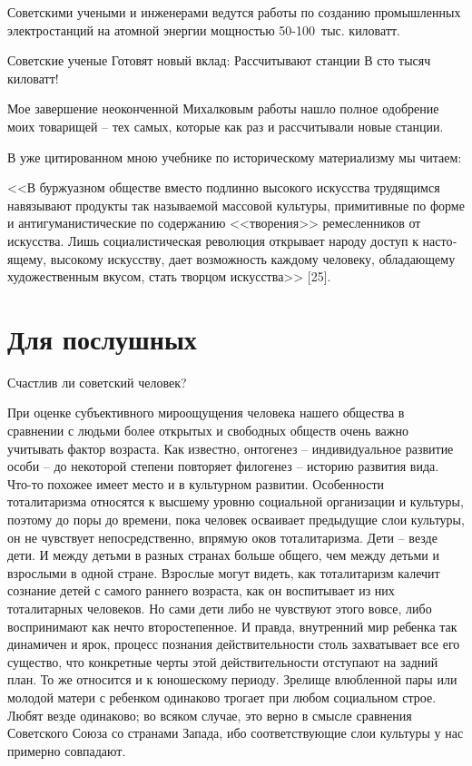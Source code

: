 \documentclass{book}
\begin{document}
\begin{minipage}{0.4\textwidth}
Советскими учеными и инженерами ведутся работы по созданию промышленных электростанций на атомной энергии мощностью 50-100~тыс. киловатт.
\end{minipage}
\hfill
\begin{minipage}{0.4\textwidth}
Советские ученые
Готовят новый вклад:
Рассчитывают станции
В сто тысяч киловатт!
\end{minipage}

Мое завершение неоконченной Михалковым работы нашло полное одобрение моих товарищей -- тех самых, которые как раз и рассчитывали 
новые станции.

В уже цитированном мною учебнике по историческому материализму мы читаем:

<<В буржуазном обществе вместо подлинно высокого искусства трудящимся навязывают продукты так называемой массовой культуры, 
примитивные по форме и антигуманистические по содержанию <<творения>> ремесленников от искусства. Лишь социалистическая революция 
открывает народу доступ к насто­ящему, высокому искусству, дает возможность каждому чело­веку, обладающему художественным вкусом, 
стать творцом искусства>> [25].


\section{Для послушных}

Счастлив ли советский человек?

При оценке субъективного мироощущения человека нашего общества в сравнении с людьми более открытых и свободных обществ очень 
важно учитывать фактор возраста. Как известно, онтогенез -- индивидуальное развитие особи -- до некоторой степени повторяет 
филогенез -- историю развития вида. Что-то похожее имеет место и в культурном развитии. Особен­ности тоталитаризма относятся к 
высшему уровню социальной организации и культуры, поэтому до поры до времени, пока человек осваивает предыдущие слои культуры, 
он не чувствует непосредственно, впрямую оков тоталитаризма. Дети -- везде дети. И между детьми в разных странах больше общего, 
чем между детьми и взрослыми в одной стране. Взрослые могут видеть, как тоталитаризм калечит сознание детей с самого раннего 
возраста, как он воспитывает из них тоталитарных человеков. Но сами дети либо не чувствуют этого вовсе, либо воспринимают как 
нечто второстепенное. И правда, внутренний мир ребенка так динамичен и ярок, процесс познания действительности столь захватывает 
все его существо, что конкретные черты этой действительности отступают на задний план. То же относится и к юношескому периоду. 
Зрелище влюбленной пары или молодой матери с ребенком одинаково трогает при любом социальном строе. Любят везде одинаково; во 
всяком случае, это верно в смысле сравнения Советского Союза со странами Запада, ибо соответствующие слои культуры у нас 
примерно совпадают.
\end{document}
